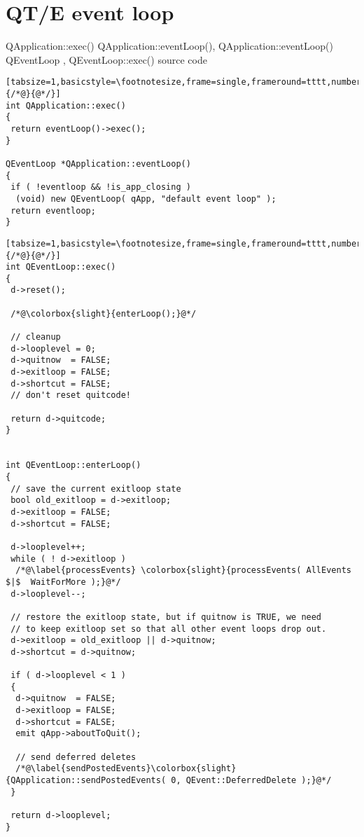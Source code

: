 \chapter{QT/E event loop {\MbQ{}}}
QApplication::exec() {\MbQ{}} QApplication::eventLoop(),
{\McQ{}} QApplication::eventLoop() {\MbQ{}} QEventLoop {\MbQ{}},
{\MbQ{}} QEventLoop::exec(){\MaQ{}}\zZ
{\MaQ{}} source code{\MaQ{}}\zZ

\begin{lstlisting}[tabsize=1,basicstyle=\footnotesize,frame=single,frameround=tttt,numbers=left,breaklines=true,title=\$QTDIR/src/kernel/qapplication.cpp,escapeinside={/*@}{@*/}]
int QApplication::exec()
{
 return eventLoop()->exec();
}

QEventLoop *QApplication::eventLoop()
{
 if ( !eventloop && !is_app_closing )
  (void) new QEventLoop( qApp, "default event loop" );
 return eventloop;
}
\end{lstlisting}


\begin{lstlisting}[tabsize=1,basicstyle=\footnotesize,frame=single,frameround=tttt,numbers=left,breaklines=true,title=\$QTDIR/src/kernel/qeventloop.cpp,escapeinside={/*@}{@*/}]
int QEventLoop::exec()
{
 d->reset();

 /*@\colorbox{slight}{enterLoop();}@*/

 // cleanup
 d->looplevel = 0;
 d->quitnow  = FALSE;
 d->exitloop = FALSE;
 d->shortcut = FALSE;
 // don't reset quitcode!

 return d->quitcode;
}


int QEventLoop::enterLoop()
{
 // save the current exitloop state
 bool old_exitloop = d->exitloop;
 d->exitloop = FALSE;
 d->shortcut = FALSE;

 d->looplevel++;
 while ( ! d->exitloop )
  /*@\label{processEvents} \colorbox{slight}{processEvents( AllEvents  $|$  WaitForMore );}@*/
 d->looplevel--;

 // restore the exitloop state, but if quitnow is TRUE, we need 
 // to keep exitloop set so that all other event loops drop out.
 d->exitloop = old_exitloop || d->quitnow;
 d->shortcut = d->quitnow;

 if ( d->looplevel < 1 ) 
 {
  d->quitnow  = FALSE;
  d->exitloop = FALSE;
  d->shortcut = FALSE;
  emit qApp->aboutToQuit();

  // send deferred deletes
  /*@\label{sendPostedEvents}\colorbox{slight}{QApplication::sendPostedEvents( 0, QEvent::DeferredDelete );}@*/
 }

 return d->looplevel;
}

\end{lstlisting}



